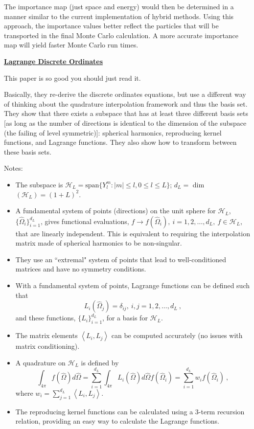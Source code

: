 \documentclass[12pt,twoside]{article}
\newcommand{\vOmega}{\ensuremath{\hat{\Omega}}}
\begin{document}
The importance map (just space and energy) would then be determined in a manner similar to the current implementation of hybrid methods.  Using this approach, the importance values better reflect the particles that will be transported in the final Monte Carlo calculation.  A more accurate importance map will yield faster Monte Carlo run times.


\vspace*{3em}
\begin{center}
\underline{\textbf{Lagrange Discrete Ordinates}} \cite{Ahrens2014}
\end{center}

This paper is so good you should just read it. 

Basically, they re-derive the discrete ordinates equations, but use a different way of thinking about the quadrature interpolation framework and thus the basis set. They show that there exists a subspace that has at least three different basis sets [as long as the number of directions is identical to the dimension of the subspace (the failing of level symmetric)]: spherical harmonics, reproducing kernel functions, and Lagrange functions. They also show how to transform between these basis sets. 

Notes:
\begin{itemize}
\item The subspace is $\mathcal{H}_L = \text{span}\{ Y_l^m : |m| \leq l, 0 \leq l \leq L \}$; $d_L = $ dim$(\mathcal{H}_L) = (1 + L)^2$.
%
\item A fundamental system of points (directions) on the unit sphere for $\mathcal{H}_L$, $\{\vOmega_i\}_{i=1}^{d_L}$, gives functional evaluations, $f \rightarrow f(\vOmega_i), \: i = 1, 2, \dots, d_L, \: f\in \mathcal{H}_L$, that are linearly independent. This is equivalent to requiring the interpolation matrix made of spherical harmonics to be non-singular.
%
\item They use an ``extremal" system of points that lead to well-conditioned matrices and have no symmetry conditions.
%
\item With a fundamental system of points, Lagrange functions can be defined such that
$$ L_i(\vOmega_j) = \delta_{ij}, \: i,j = 1, 2, \dots, d_L\:,$$
and these functions, $\{L_i\}_{i=1}^{d_L}$, for a basis for $\mathcal{H}_L$.
%
\item The matrix elements $\left\langle L_i, L_j \right\rangle$ can be computed accurately (no issues with matrix conditioning).
%
\item A quadrature on $\mathcal{H}_L$ is defined by
$$\int_{4 \pi} f(\vOmega) d\vOmega = \sum_{i=1}^{d_L} \int_{4 \pi} L_i(\vOmega) d\vOmega f(\vOmega_i) = \sum_{i=1}^{d_L} w_i f(\vOmega_i)\:,$$
where $w_i = \sum_{j=1}^{d_L} \left\langle L_i, L_j \right\rangle$.
%
\item The reproducing kernel functions can be calculated using a 3-term recursion relation, providing an easy way to calculate the Lagrange functions. 
\end{itemize}
\end{document}
